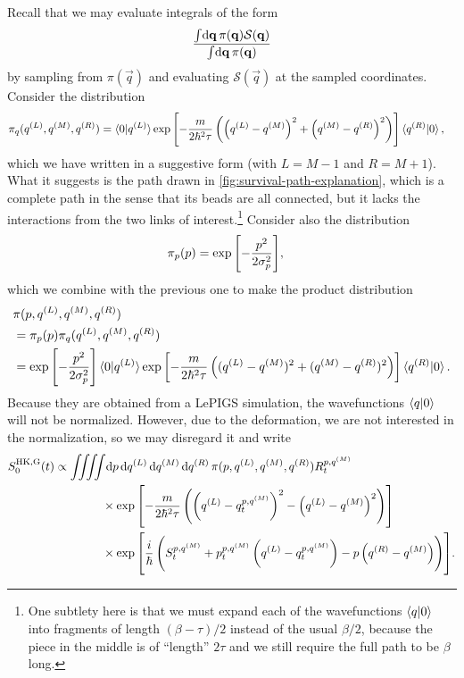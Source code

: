 Recall that we may evaluate integrals of the form
\begin{align}
	\frac{
			\int\! \dif \vec{q} \, \pi(\vec{q}) \mathcal{S}(\vec{q})
		}{
			\int\! \dif \vec{q} \, \pi(\vec{q})
		}
\end{align}
by sampling from $\pi(\vec{q})$ and evaluating $\mathcal{S}(\vec{q})$ at the sampled coordinates.
Consider the distribution
\begin{align}
	\pi_q(q^{(L)}, q^{(M)}, q^{(R)})
	&= \braket{0 | q^{(L)}} \exp{\left[ -\frac{m}{2 \hbar^2 \tau} \left( \left( q^{(L)}- q^{(M)}\right)^2 + \left( q^{(M)}- q^{(R)}\right)^2 \right) \right]} \braket{q^{(R)} | 0},
		\label{eq:hk-dist-q}
\end{align}
which we have written in a suggestive form (with $L = M - 1$ and $R = M + 1$).
What it suggests is the path drawn in \cref{fig:survival-path-explanation}, which is a complete path in the sense that its beads are all connected, but it lacks the interactions from the two links of interest.\footnote{
	One subtlety here is that we must expand each of the wavefunctions $\braket{q | 0}$ into fragments of length $(\beta - \tau) / 2$ instead of the usual $\beta / 2$, because the piece in the middle is of ``length'' $2 \tau$ and we still require the full path to be $\beta$ long.
}
Consider also the distribution
\begin{align}
	\pi_p(p)
	&= \exp{\left[ -\frac{p^2}{2 \sigma_p^2} \right]},
\end{align}
which we combine with the previous one to make the product distribution
\begin{subequations}
\begin{align}
	& \pi(p, q^{(L)}, q^{(M)}, q^{(R)}) \notag \\
	&= \pi_p(p) \pi_q(q^{(L)}, q^{(M)}, q^{(R)}) \\
	&= \exp{\left[ -\frac{p^2}{2 \sigma_p^2} \right]}
		\braket{0 | q^{(L)}} \exp{\left[ -\frac{m}{2 \hbar^2 \tau} \left( (q^{(L)}- q^{(M)})^2 + (q^{(M)}- q^{(R)})^2 \right) \right]} \braket{q^{(R)} | 0}.
\end{align}
\end{subequations}
Because they are obtained from a LePIGS simulation, the wavefunctions $\braket{q | 0}$ will not be normalized.
However, due to the deformation, we are not interested in the normalization, so we may disregard it and write
\begin{align}
	S_0\hkg(t)
	&\propto \iiiint\! \dif p \dif q\LL \dif q\MM \dif q\RR \,
			\pi(p, q\LL, q\MM, q\RR) R\coh{p}{q\MM}_t \notag \\
	&\qquad\qquad\times
			\expb{-\frac{m}{2 \hbar^2 \tau} \left( \left( q\LL - q\coh{p}{q\MM}_t \right)^2 - \left( q\LL - q\MM \right)^2 \right)} \notag \\
	&\qquad\qquad\times
			\expb{\frac{i}{\hbar} \left( S\coh{p}{q\MM}_t + p\coh{p}{q\MM}_t \left( q\LL - q\coh{p}{q\MM}_t \right) - p \left( q\RR - q\MM \right) \right)}.
\end{align}
